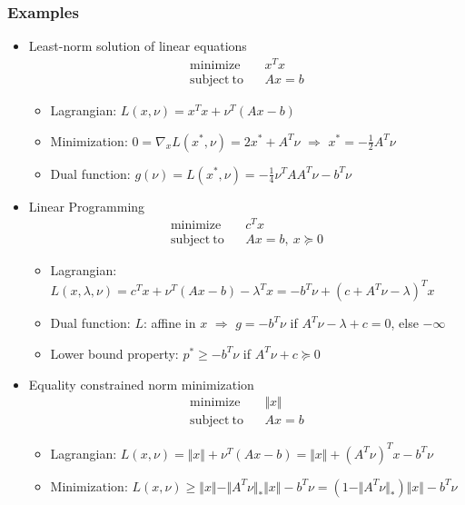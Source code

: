 \subsubsection*{Examples}
\begin{itemize}
    \item Least-norm solution of linear equations
        $$ \begin{aligned}
            \mathrm{minimize}~~&~~x^Tx \\
            \mathrm{subject~to}~~&~~Ax = b
        \end{aligned} $$
    \begin{itemize}
        \item Lagrangian: $L(x,\nu) = x^Tx + \nu^T(Ax-b)$
        \item Minimization: $0 = \nabla_xL(x^\ast,\nu) = 2x^\ast+A^T\nu$ $\Rightarrow$ $x^\ast=-\frac{1}{2}A^T\nu$
        \item Dual function: $g(\nu)=L(x^\ast,\nu)=-\frac{1}{4}\nu^TAA^T\nu-b^T\nu$
    \end{itemize}
    \item Linear Programming
        $$ \begin{aligned}
            \mathrm{minimize}~~&~~c^Tx \\
            \mathrm{subject~to}~~&~~Ax = b,~x\succeq 0
        \end{aligned} $$
    \begin{itemize}
        \item Lagrangian: $L(x,\lambda,\nu)=c^Tx+\nu^T(Ax-b)-\lambda^Tx = -b^T\nu+(c+A^T\nu-\lambda)^Tx$
        \item Dual function: $L$: affine in $x$ $\Rightarrow$ $g = -b^T\nu$ if $A^T\nu-\lambda+c=0$, else $-\infty$
        \item Lower bound property: $p^\ast\geq-b^T\nu$ if $A^T\nu + c \succeq 0$
    \end{itemize}
    \item Equality constrained norm minimization
        $$ \begin{aligned}
            \mathrm{minimize}~~&~~\Vert x \Vert \\
            \mathrm{subject~to}~~&~~Ax = b
        \end{aligned} $$
    \begin{itemize}
        \item Lagrangian: $L(x,\nu)=\Vert x\Vert+\nu^T(Ax-b) = \Vert x\Vert + (A^T\nu)^Tx - b^T\nu$
        \item Minimization: $L(x,\nu)\geq\Vert x\Vert -\Vert A^T\nu\Vert_\ast \Vert x\Vert - b^T\nu = (1-\Vert A^T\nu\Vert_\ast)\Vert x\Vert-b^T\nu$

\end{itemize}
\end{itemize}
